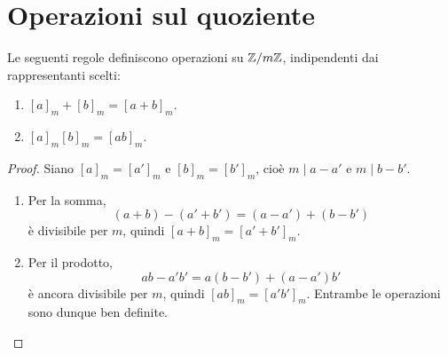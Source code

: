 \section{Operazioni sul quoziente}
\begin{proposizione}\label{prop:operazioni-modulari}
Le seguenti regole definiscono operazioni su $\mathbb{Z}/m\mathbb{Z}$, indipendenti dai rappresentanti scelti:
\begin{enumerate}[label=\arabic*.]
\item $[a]_m+[b]_m=[a+b]_m$.
\item $[a]_m[b]_m=[ab]_m$.
\end{enumerate}
\end{proposizione}
\begin{proof}
Siano $[a]_m=[a']_m$ e $[b]_m=[b']_m$, cioè $m\mid a-a'$ e $m\mid b-b'$. \begin{enumerate}[label=\arabic*.]
\item Per la somma,
\[
(a+b)-(a'+b')=(a-a')+(b-b')
\]
è divisibile per $m$, quindi $[a+b]_m=[a'+b']_m$.
\item Per il prodotto,
\[
ab-a'b'=a(b-b')+(a-a')b'
\]
è ancora divisibile per $m$, quindi $[ab]_m=[a'b']_m$. Entrambe le operazioni sono dunque ben definite.
\end{enumerate}
\end{proof}


